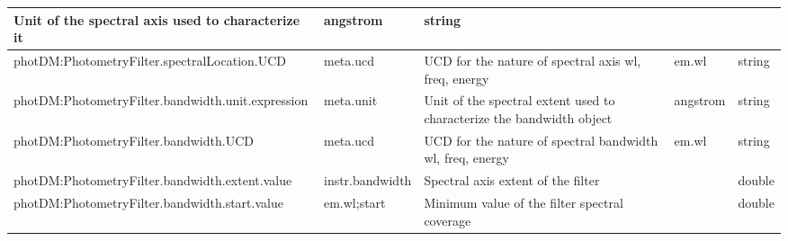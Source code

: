 \documentclass[11pt,a4paper]{ivoa}
\begin{document}
\begin{table}[H]
\begin{adjustbox}{angle=90}
\begin{tabular}{p{5in}p{0.87in}p{2in}p{0.4in}p{0.25in}}
\multicolumn{1}{p{2in}}{{\fontsize{8pt}{8pt}\selectfont Unit of the spectral axis used to characterize it}} & 
\multicolumn{1}{p{0.74in}}{{\fontsize{8pt}{8pt}\selectfont angstrom}} & 
\multicolumn{1}{p{0.35in}}{{\fontsize{8pt}{8pt}\selectfont string}} \\
\hline
\multicolumn{1}{p{5in}}{{\fontsize{8pt}{8pt}\selectfont photDM:PhotometryFilter.spectralLocation.UCD}} & 
\multicolumn{1}{p{0.87in}}{{\fontsize{8pt}{8pt}\selectfont meta.ucd }} & 
\multicolumn{1}{p{2in}}{{\fontsize{8pt}{8pt}\selectfont UCD for the nature of spectral axis wl, freq, energy}} & 
\multicolumn{1}{p{0.74in}}{{\fontsize{8pt}{8pt}\selectfont em.wl}} & 
\multicolumn{1}{p{0.35in}}{{\fontsize{8pt}{8pt}\selectfont string}} \\
\hline
\multicolumn{1}{p{5in}}{{\fontsize{8pt}{8pt}\selectfont photDM:PhotometryFilter.bandwidth.unit.expression}} & 
\multicolumn{1}{p{0.87in}}{{\fontsize{8pt}{8pt}\selectfont meta.unit}} & 
\multicolumn{1}{p{2in}}{{\fontsize{8pt}{8pt}\selectfont Unit of the spectral extent used to characterize the bandwidth object}} & 
\multicolumn{1}{p{0.74in}}{{\fontsize{10pt}{12.0pt}\selectfont angstrom}} & 
\multicolumn{1}{p{0.35in}}{{\fontsize{8pt}{8pt}\selectfont string}} \\
\hline
\multicolumn{1}{p{5in}}{
{\fontsize{8pt}{8pt}\selectfont photDM:PhotometryFilter.bandwidth.UCD}} & 
\multicolumn{1}{p{0.87in}}{{\fontsize{8pt}{8pt}\selectfont meta.ucd }} & 
\multicolumn{1}{p{2in}}{{\fontsize{8pt}{8pt}\selectfont UCD for the nature of spectral bandwidth wl, freq, energy}} & 
\multicolumn{1}{p{0.74in}}{{\fontsize{8pt}{8pt}\selectfont em.wl}} & 
\multicolumn{1}{p{0.35in}}{{\fontsize{8pt}{8pt}\selectfont string}} \\
\hline
\multicolumn{1}{p{5in}}{{\fontsize{8pt}{8pt}\selectfont photDM:PhotometryFilter.bandwidth.extent.value}} & 
\multicolumn{1}{p{0.87in}}{{\fontsize{8pt}{8pt}\selectfont instr.bandwidth}} & 
\multicolumn{1}{p{2in}}{{\fontsize{8pt}{8pt}\selectfont Spectral axis extent of the filter}} & 
\multicolumn{1}{p{0.74in}}{} & 
\multicolumn{1}{p{0.35in}}{{\fontsize{8pt}{8pt}\selectfont double}} \\
\hline
\multicolumn{1}{p{5in}}{{\fontsize{8pt}{8pt}\selectfont photDM:PhotometryFilter.bandwidth.start.value}} & 
\multicolumn{1}{p{0.87in}}{{\fontsize{8pt}{8pt}\selectfont em.wl;start}} & 
\multicolumn{1}{p{2in}}{{\fontsize{8pt}{8pt}\selectfont Minimum value of the filter spectral coverage}} & 
\multicolumn{1}{p{0.74in}}{} & 
\multicolumn{1}{p{0.35in}}{{\fontsize{8pt}{8pt}\selectfont double}} \\

\end{tabular}
\end{adjustbox}
\end{table}
\end{document}
